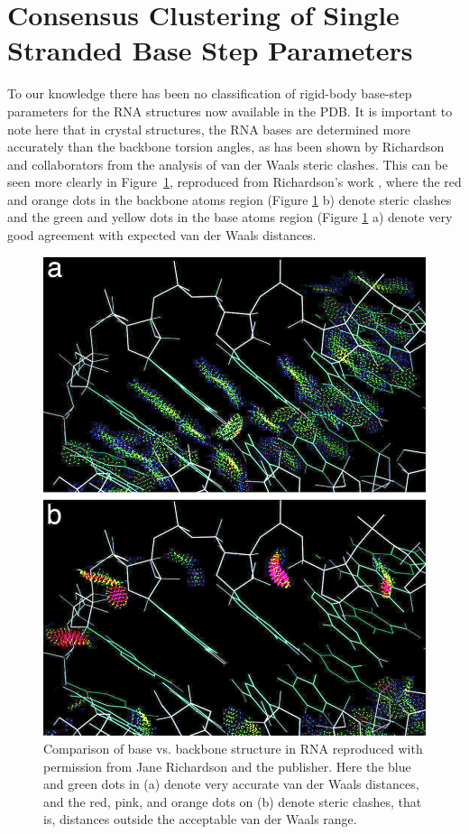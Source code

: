 \section{Consensus Clustering of Single Stranded Base Step Parameters}
To  our  knowledge there  has  been  no  classification of  rigid-body
base-step parameters for the RNA  structures now available in the PDB.
It is important to note here that in crystal structures, the RNA bases
are determined  more accurately than  the backbone torsion  angles, as
has been  shown by Richardson  and collaborators from the  analysis of
van  der Waals  steric  clashes.  This  can  be seen  more clearly  in
Figure~\ref{fig:murray},    reproduced    from    Richardson's    work
\cite{murray2003}, where the red and orange dots in the backbone atoms
region (Figure \ref{fig:murray} b) denote steric clashes and the green
and yellow dots in the base atoms region (Figure \ref{fig:murray} a)
denote very good agreement with expected van der Waals distances.
\begin{figure}[htbp]
 \centering
 \includegraphics[scale=0.4]{Chapter2/murray2003.png}
 \caption{Comparison of base vs.  backbone structure in RNA reproduced
   with  permission  from Jane  Richardson  \cite{murray2003} and  the
   publisher. Here the blue and green dots in (a) denote very accurate
   van der Waals distances, and the  red, pink, and orange dots on (b)
   denote steric  clashes, that  is, distances outside  the acceptable
   van der Waals range.}
 \label{fig:murray}
\end{figure}

